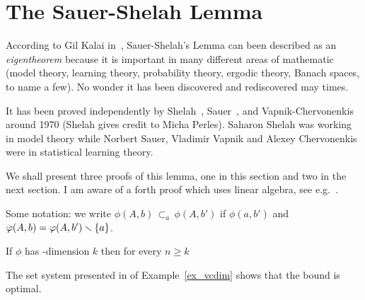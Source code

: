 \documentclass[sputnik.tex]{subfiles}
\begin{document}
\section{The Sauer-Shelah Lemma}

According to Gil Kalai in~\cite{kalai}, Sauer-Shelah's Lemma can been described as an \textit{eigentheorem\/} because it is important in many different areas of mathematic (model theory, learning theory, probability theory, ergodic theory, Banach spaces, to name a few).
No wonder it has been discovered and rediscovered may times.

It has been proved independently by Shelah~\cite{shelah72}, Sauer~\cite{sauer}, and Vapnik-Cher\-vo\-nen\-kis~\cite{VC} around 1970 (Shelah gives credit to Micha Perles).
Saharon Shelah was working in model theory while Norbert Sauer, Vladimir Vapnik and Alexey Chervonenkis were in statistical learning theory.

We shall present three proofs of this lemma, one in this section and two in the next section. I am aware of a forth proof which uses linear algebra, see e.g.~\cite{gowers}. 

Some notation: we write $\phi(A,b)$\emph{$\,\subset_a\,$}$\phi(A,b')$ if $\phi(a,b')$ and $\varphi(A,b)=\varphi(A,b')\smallsetminus\{a\}$.


\begin{proposition}\label{prop_Sauer}
If $\phi$ has \vc-dimension $k$ then for every $n\ge k$

\end{proposition}

The set system presented in  of Example~\ref{ex_vcdim} shows that the bound is optimal.
\end{document}
